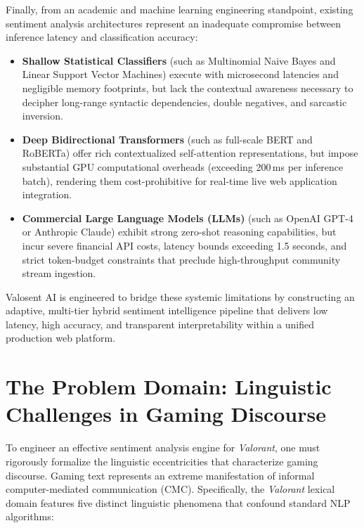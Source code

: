 Finally, from an academic and machine learning engineering standpoint, existing sentiment analysis architectures represent an inadequate compromise between inference latency and classification accuracy:
\begin{itemize}
    \item \textbf{Shallow Statistical Classifiers} (such as Multinomial Naive Bayes and Linear Support Vector Machines) execute with microsecond latencies and negligible memory footprints, but lack the contextual awareness necessary to decipher long-range syntactic dependencies, double negatives, and sarcastic inversion.
    \item \textbf{Deep Bidirectional Transformers} (such as full-scale BERT and RoBERTa) offer rich contextualized self-attention representations, but impose substantial GPU computational overheads (exceeding 200\,ms per inference batch), rendering them cost-prohibitive for real-time live web application integration.
    \item \textbf{Commercial Large Language Models (LLMs)} (such as OpenAI GPT-4 or Anthropic Claude) exhibit strong zero-shot reasoning capabilities, but incur severe financial API costs, latency bounds exceeding 1.5 seconds, and strict token-budget constraints that preclude high-throughput community stream ingestion.
\end{itemize}

Valosent AI is engineered to bridge these systemic limitations by constructing an adaptive, multi-tier hybrid sentiment intelligence pipeline that delivers low latency, high accuracy, and transparent interpretability within a unified production web platform.

\section{The Problem Domain: Linguistic Challenges in Gaming Discourse}
\label{sec:problem_domain}

To engineer an effective sentiment analysis engine for \textit{Valorant}, one must rigorously formalize the linguistic eccentricities that characterize gaming discourse. Gaming text represents an extreme manifestation of informal computer-mediated communication (CMC). Specifically, the \textit{Valorant} lexical domain features five distinct linguistic phenomena that confound standard NLP algorithms:

